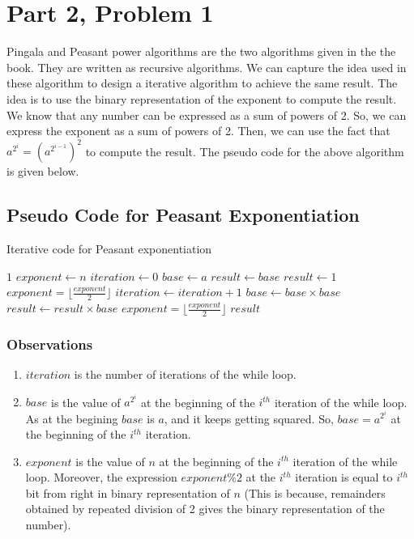 \documentclass{article}
\begin{document}
\section*{Part 2, Problem 1}
Pingala and Peasant power algorithms are the two algorithms given in the the book. They are written as recursive algorithms. We can capture the idea used in these algorithm to design a iterative algorithm to achieve the same result. The idea is to use the binary representation of the exponent to compute the result. We know that any number can be expressed as a sum of powers of 2. So, we can express the exponent as a sum of powers of 2. Then, we can use the fact that $a^{2^i} = (a^{2^{i-1}})^2$ to compute the result. The pseudo code for the above algorithm is given below.
\subsection*{Pseudo Code for Peasant Exponentiation}
\begin{algorithm}
    \caption{Iterative code for Peasant exponentiation}
    \begin{algorithmic}[1]
            \State \Return $1$
        \EndIf
        \State $exponent \gets n$
        \State $iteration \gets 0$
        \State $base \gets a$
            \State $result \gets base$
        \Else
            \State $result \gets 1$
        \EndIf
        \State $exponent = \lfloor \frac{exponent}{2} \rfloor$
            \State $iteration \gets iteration + 1$
            \State $base \gets base \times base$
                \State $result \gets result \times base$
            \EndIf
            \State $exponent = \lfloor \frac{exponent}{2} \rfloor$
        \EndWhile
        \State \Return $result$
        \EndFunction
    \end{algorithmic}
\end{algorithm}

\subsubsection*{Observations}
\begin{enumerate}
    \item $iteration$ is the number of iterations of the while loop.
    \item $base$ is the value of $a^{2^i}$ at the beginning of the $i^{th}$ iteration of the while loop. As at the begining $base$ is $a$, and it keeps getting squared. So, $base = a^{2^i}$ at the beginning of the $i^{th}$ iteration.
    \item $exponent$ is the value of $n$ at the beginning of the $i^{th}$ iteration of the while loop. Moreover, the expression $exponent\%2$ at the $i^{th}$ iteration is equal to $i^{th}$ bit from right in binary representation of $n$ (This is because, remainders obtained by repeated division of 2 gives the binary representation of the number).
\end{enumerate}
\end{document}
